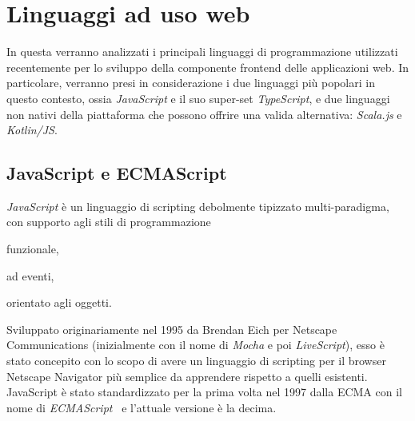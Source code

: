 
  \section{Linguaggi ad uso web}\label{sec:lang}
    In questa  verranno analizzati i principali linguaggi di programmazione utilizzati recentemente per lo sviluppo della componente frontend delle applicazioni web.
    In particolare, verranno presi in considerazione i due linguaggi più popolari in questo contesto, ossia \emph{JavaScript} e il suo super-set \emph{TypeScript}, e due linguaggi non nativi della piattaforma che possono offrire una valida alternativa:
    \emph{Scala.js} e \emph{Kotlin/JS}\@.

    \subsection{JavaScript e ECMAScript}\label{subsec:js}


      \emph{JavaScript} è un linguaggio di scripting debolmente tipizzato multi-paradigma, con supporto agli stili di programmazione %
      \begin{inparaitem}
        \item funzionale,
        \item ad eventi,
        \item orientato agli oggetti.
      \end{inparaitem}
      Sviluppato originariamente nel 1995 da Brendan Eich per Netscape Communications (inizialmente con il nome di \emph{Mocha} e poi \emph{LiveScript}),
      esso è stato concepito con lo scopo di avere un linguaggio di scripting per il browser Netscape Navigator più semplice da apprendere rispetto a quelli esistenti.
      JavaScript è stato standardizzato per la prima volta nel 1997 dalla ECMA con il nome di \emph{ECMAScript}~\cite{ECMA-262,ISO:1998} e l'attuale versione è la decima.

